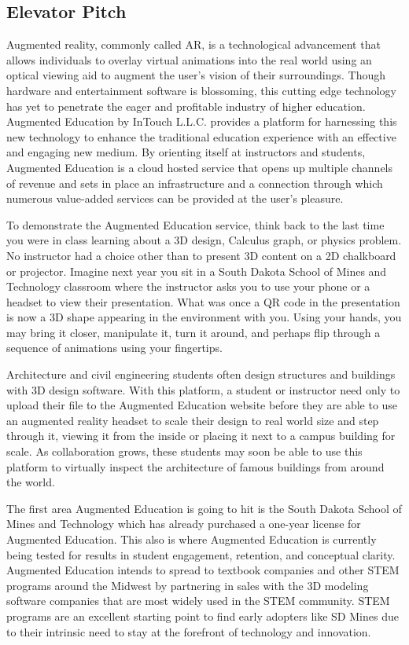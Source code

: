 \subsection{Elevator Pitch}
Augmented reality, commonly called AR, is a technological advancement that allows individuals to overlay virtual animations into the real world using an optical viewing aid to augment the user’s vision of their surroundings. Though hardware and entertainment software is blossoming, this cutting edge technology has yet to penetrate the eager and profitable industry of higher education. Augmented Education by InTouch L.L.C. provides a platform for harnessing this new technology to enhance the traditional education experience with an effective and engaging new medium. By orienting itself at instructors and students, Augmented Education is a cloud hosted service that opens up multiple channels of revenue and sets in place an infrastructure and a connection through which numerous value-added services can be provided at the user’s pleasure.

To demonstrate the Augmented Education service, think back to the last time you were in class learning about a 3D design, Calculus graph, or physics problem. No instructor had a choice other than to present 3D content on a 2D chalkboard or projector. Imagine next year you sit in  a South Dakota School of Mines and Technology classroom where the instructor asks you to use your phone or a headset to view their presentation. What was once a QR code in the presentation is now a 3D shape appearing in the environment with you. Using your hands, you may bring it closer, manipulate it, turn it around, and perhaps flip through a sequence of animations using your fingertips.

Architecture and civil engineering students often design structures and buildings with 3D design software. With this platform, a student or instructor need only to upload their file to the Augmented Education website before they are able to use an augmented reality headset to scale their design to real world size and step through it, viewing it from the inside or placing it next to a campus building for scale. As collaboration grows, these students may soon be able to use this platform to virtually inspect the architecture of famous buildings from around the world. 

The first area Augmented Education is going to hit is the South Dakota School of Mines and Technology which has already purchased a one-year license for Augmented Education. This also is where Augmented Education is currently being tested for results in student engagement, retention, and conceptual clarity. Augmented Education intends to spread to textbook companies and other STEM programs around the Midwest by partnering in sales with the 3D modeling software companies that are most widely used in the STEM community. STEM programs are an excellent starting point to find early adopters like SD Mines due to their intrinsic need to stay at the forefront of technology and innovation. 

